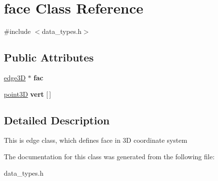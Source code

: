 \hypertarget{classface}{}\section{face Class Reference}
\label{classface}


{\ttfamily \#include $<$data\+\_\+types.\+h$>$}

\subsection*{Public Attributes}
\begin{DoxyCompactItemize}
\item 
\mbox{\label{classface_ac86621224e0a3f100b3e6956243dd2ea}} 
\mbox{\hyperlink{classedge3_d}{edge3D}} $\ast$ {\bfseries fac}
\item 
\mbox{\label{classface_a81ad59ba6c11d4918be718a16df422dd}} 
\mbox{\hyperlink{classpoint3_d}{point3D}} {\bfseries vert} \mbox{[}$\,$\mbox{]}
\end{DoxyCompactItemize}


\subsection{Detailed Description}
This is edge class, which defines face in 3D coordinate system 

The documentation for this class was generated from the following file\+:\begin{DoxyCompactItemize}
\item 
data\+\_\+types.\+h\end{DoxyCompactItemize}
